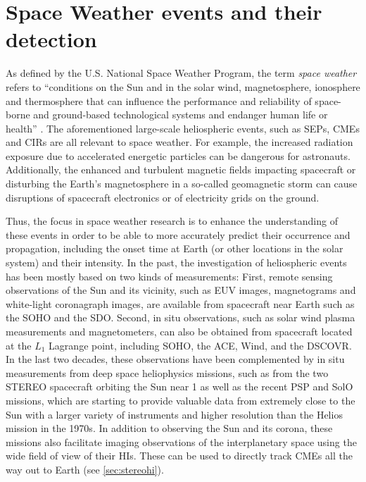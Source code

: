 \section{Space Weather events and their detection}
\label{sec:spaceweather}

As defined by the U.S. National Space Weather Program, the term \textit{space weather} refers to ``conditions on the Sun and in the solar wind, magnetosphere, ionosphere and thermosphere that can influence the performance and reliability of space-borne and ground-based technological systems and endanger human life or health'' \parencite{OFCM-1995}.
The aforementioned large-scale heliospheric events, such as \acp{SEP}, \acp{CME} and \acp{CIR} are all relevant to space weather. For example, the increased radiation exposure due to accelerated energetic particles can be dangerous for astronauts. Additionally, the enhanced and turbulent magnetic fields impacting spacecraft or disturbing the Earth's magnetosphere in a so-called geomagnetic storm can cause disruptions of spacecraft electronics or of electricity grids on the ground.

Thus, the focus in space weather research is to enhance the understanding of these events in order to be able to more accurately predict their occurrence and propagation, including the onset time at Earth (or other locations in the solar system) and their intensity.
In the past, the investigation of heliospheric events has been mostly based on two kinds of measurements: First, remote sensing observations of the Sun and its vicinity, such as \ac{EUV} images, magnetograms and white-light coronagraph images, are available from spacecraft near Earth such as the \ac{SOHO} and the \ac{SDO}. Second, in situ observations, such as solar wind plasma measurements and magnetometers, can also be obtained from spacecraft located at the $L_1$ Lagrange point, including \ac{SOHO}, the \ac{ACE}, Wind, and the \ac{DSCOVR}.
In the last two decades, these observations have been complemented by in situ measurements from deep space heliophysics missions, such as from the two \ac{STEREO} spacecraft orbiting the Sun near \SI{1}{\AU} as well as the recent \ac{PSP} and \ac{SolO} missions, which are starting to provide valuable data from extremely close to the Sun with a larger variety of instruments and higher resolution than the Helios mission in the 1970s. In addition to observing the Sun and its corona, these missions also facilitate imaging observations of the interplanetary space using the wide field of view of their \acp{HI}. These can be used to directly track \acp{CME} all the way out to Earth (see \autoref{sec:stereohi}).

